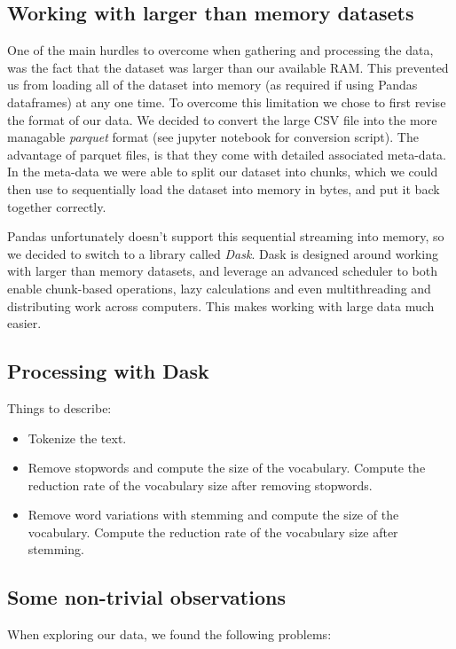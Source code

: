 \subsection{Working with larger than memory datasets}
One of the main hurdles to overcome when gathering and processing the data, was the fact that the dataset was larger
than our available RAM. This prevented us from loading all of the dataset into memory (as required if using Pandas
dataframes) at any one time. To overcome this limitation we chose to first revise the format of our data. We decided to
convert the large CSV file into the more managable \textit{parquet} format (see jupyter notebook for conversion script). The advantage of parquet files, is that they
come with detailed associated meta-data. In the meta-data we were able to split our dataset into chunks, which we could
then use to sequentially load the dataset into memory in bytes, and put it back together correctly.

Pandas unfortunately doesn't support this sequential streaming into memory, so we decided to switch to a library called
\textit{Dask}. Dask is designed around working with larger than memory datasets, and leverage an advanced scheduler to both
enable chunk-based operations, lazy calculations and even multithreading and distributing work across computers. This makes working with large data much easier.
\subsection{Processing with Dask}
Things to describe:
\begin{itemize}
    \item Tokenize the text.
    \item Remove stopwords and compute the size of the vocabulary. Compute the reduction rate of the vocabulary size after removing stopwords.
    \item Remove word variations with stemming and compute the size of the vocabulary. Compute the reduction rate of the vocabulary size after stemming.
\end{itemize}
    
    
    

\subsection{Some non-trivial observations}
When exploring our data, we found the following problems:
